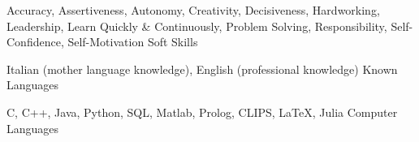 

\begin{cventries}

  \cventry
      {Accuracy, Assertiveness, Autonomy, Creativity, Decisiveness, Hardworking, Leadership, Learn Quickly \& Continuously, Problem Solving, Responsibility, Self-Confidence, Self-Motivation}
    {Soft Skills}
    {}
    {}
    {}

  \cventry
    {Italian (mother language knowledge), English (professional knowledge)}
    {Known Languages}
    {}
    {}
    {}

  \cventry
    {C, C++, Java, Python, SQL, Matlab, Prolog, CLIPS, LaTeX, Julia}
    {Computer Languages}
    {}
    {}
    {}

\end{cventries}

